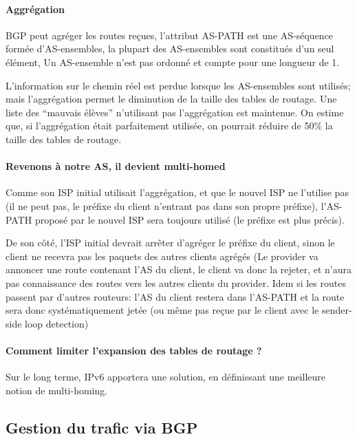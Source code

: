 \documentclass{article}
\begin{document}
\begin{sffamily}
\paragraph{Aggrégation}

BGP peut agréger les routes reçues, l'attribut AS-PATH est une
AS-séquence formée d'AS-ensembles, la plupart des AS-ensembles sont
constitués d'un seul élément, Un AS-ensemble n'est pas ordonné et
compte pour une longueur de 1.

L'information sur le chemin réel est perdue lorsque les AS-ensembles
sont utilisés; mais l'aggrégation permet le diminution de la taille
des tables de routage. Une liste des ``mauvais élèves'' n'utilisant
pas l'aggrégation est maintenue. On estime que, si l'aggrégation était
parfaitement utilisée, on pourrait réduire de 50\% la taille des
tables de routage.

\paragraph{Revenons à notre AS, il devient multi-homed}

Comme son ISP initial utilisait l'aggrégation, et que le nouvel ISP ne
l'utilise pas (il ne peut pas, le préfixe du client n'entrant pas dans
son propre préfixe), l'AS-PATH proposé par le nouvel ISP sera toujours
utilisé (le préfixe est plus précis).

De son côté, l'ISP initial devrait arrêter d'agréger le préfixe du
client, sinon le client ne recevra pas les paquets des autres clients
agrégés (Le provider va annoncer une route contenant l'AS du client,
le client va donc la rejeter, et n'aura pas connaissance des routes
vers les autres clients du provider. Idem si les routes passent par
d'autres routeurs: l'AS du client restera dans l'AS-PATH et la route
sera donc systématiquement jetée (ou même pas reçue par le client avec
le sender-side loop detection)

\paragraph{Comment limiter l'expansion des tables de routage ?}

Sur le long terme, IPv6 apportera une solution, en définissant une
meilleure notion de multi-homing.

\subsection{Gestion du trafic via BGP}


\end{sffamily}
\end{document}
